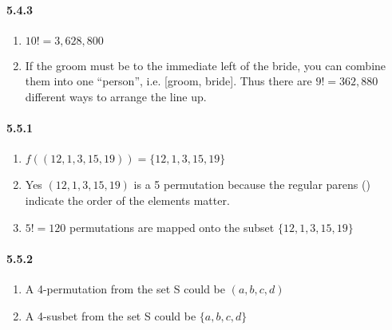 \documentclass[11pt, letterpaper, twocolumn, fleqn]{article}
\begin{document}
\paragraph{5.4.3}
\begin{enumerate}
  \item $10! = 3,628,800$
  \item If the groom must be to the immediate left of the bride, you can combine them into one ``person'', i.e. [groom, bride]. Thus there are $9! = 362,880$ different ways to arrange the line up.
\end{enumerate}

\paragraph{5.5.1}
\begin{enumerate}
  \item $f((12,1,3,15,19)) = \{12,1,3,15,19\}$
  \item Yes $(12,1,3,15,19)$ is a 5 permutation because the regular parens () indicate the order of the elements matter.
  \item $5! = 120$ permutations are mapped onto the subset $\{12,1,3,15,19\}$
\end{enumerate}

\paragraph{5.5.2}
\begin{enumerate}
  \item A 4-permutation from the set S could be $(a,b,c,d)$
  \item A 4-susbet from the set S could be $\{a,b,c,d\}$
\end{enumerate}
\end{document}
